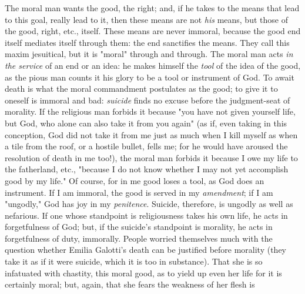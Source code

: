 \documentclass[a4paper]{book}
\begin{document}
The moral man wants the good, the right; and, if he takes to the means that 
lead to this goal, really lead to it, then these means are not \textit{his} 
means, but those of the good, right, etc., itself. These means are never 
immoral, because the good end itself mediates itself through them: the end 
sanctifies the means. They call this maxim jesuitical, but it is "{}moral"{} 
through and through. The moral man acts \textit{in the service} of an end or 
an idea: he makes himself the \textit{tool} of the idea of the good, as the 
pious man counts it his glory to be a tool or instrument of God. To await 
death is what the moral commandment postulates as the good; to give it to 
oneself is immoral and bad: \textit{suicide} finds no excuse before the 
judgment-seat of morality. If the religious man forbids it because "{}you have 
not given yourself life, but God, who alone can also take it from you again"{} 
(as if, even taking in this conception, God did not take it from me just as 
much when I kill myself as when a tile from the roof, or a hostile bullet, 
fells me; for he would have aroused the resolution of death in me too!), the 
moral man forbids it because I owe my life to the fatherland, etc., "{}because 
I do not know whether I may not yet accomplish good by my life."{} Of course, 
for in me good loses a tool, as God does an instrument. If I am immoral, the 
good is served in my \textit{amendment}; if I am "{}ungodly,"{} God has joy in 
my \textit{penitence}. Suicide, therefore, is ungodly as well as nefarious. If 
one whose standpoint is religiousness takes his own life, he acts in 
forgetfulness of God; but, if the suicide's standpoint is morality, he acts in 
forgetfulness of duty, immorally. People worried themselves much with the 
question whether Emilia Galotti's death can be justified before morality (they 
take it as if it were suicide, which it is too in substance). That she is so 
infatuated with chastity, this moral good, as to yield up even her life for it 
is certainly moral; but, again, that she fears the weakness of her flesh is 
\end{document}
